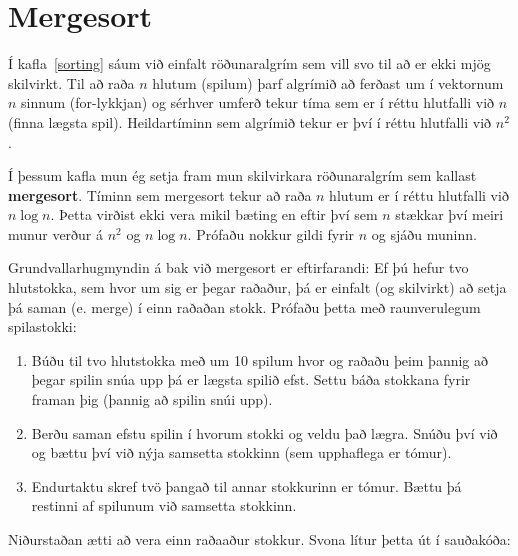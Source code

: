 

\section {Mergesort}

Í kafla~\ref{sorting} sáum við einfalt röðunaralgrím sem vill svo til að er ekki mjög skilvirkt.
Til að raða $n$ hlutum (spilum) þarf algrímið að ferðast um í vektornum $n$ sinnum (for-lykkjan) og sérhver umferð tekur tíma sem er í réttu hlutfalli við $n$ (finna lægsta spil).
Heildartíminn sem algrímið tekur er því í réttu hlutfalli við $n^2$.

Í þessum kafla mun ég setja fram mun skilvirkara röðunaralgrím sem kallast {\bf mergesort}.
Tíminn sem mergesort tekur að raða $n$ hlutum er í réttu hlutfalli við $n \log n$.
Þetta virðist ekki vera mikil bæting en eftir því sem $n$ stækkar því meiri munur verður á $n^2$ og $n \log n$.
Prófaðu nokkur gildi fyrir $n$ og sjáðu muninn. 

Grundvallarhugmyndin á bak við mergesort er eftirfarandi:
Ef þú hefur tvo hlutstokka, sem hvor um sig er þegar raðaður, þá er einfalt (og skilvirkt) að setja þá saman (e. merge) í einn raðaðan stokk.
Prófaðu þetta með raunverulegum spilastokki:

\begin{enumerate}

\item Búðu til tvo hlutstokka með um 10 spilum hvor og raðaðu þeim þannig að þegar spilin snúa upp þá er lægsta spilið efst.
Settu báða stokkana fyrir framan þig (þannig að spilin snúi upp). 

\item Berðu saman efstu spilin í hvorum stokki og veldu það lægra. 
Snúðu því við og bættu því við nýja samsetta stokkinn (sem upphaflega er tómur). 

\item Endurtaktu skref tvö þangað til annar stokkurinn er tómur. 
Bættu þá restinni af spilunum við samsetta stokkinn. 

\end{enumerate}

Niðurstaðan ætti að vera einn raðaaður stokkur.
Svona lítur þetta út í sauðakóða:

